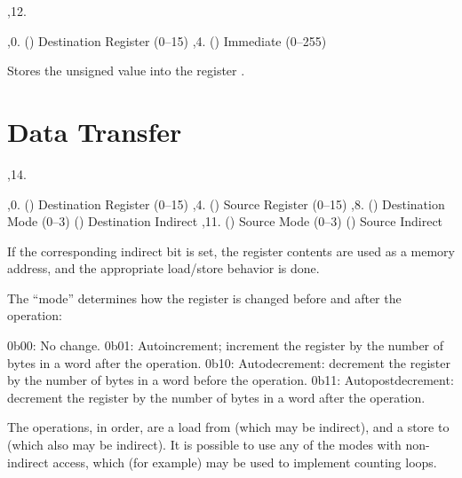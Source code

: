\noindent\ins{},12. 

\li \ins{},0. () Destination Register (0--15)
\li \ins{},4. () Immediate (0--255)

Stores the unsigned value  into the register .

\section{Data Transfer}

\noindent\ins{},14. 

\li \ins{},0. () Destination Register (0--15)
\li \ins{},4. () Source Register (0--15)
\li \ins{},8. () Destination Mode (0--3)
\li \ins{} () Destination Indirect
\li \ins{},11. () Source Mode (0--3)
\li \ins{} () Source Indirect

If the corresponding indirect bit is set, the register contents are used as a
memory address, and the appropriate load/store behavior is done.

The ``mode'' determines how the register is changed before and after the
operation:

\li 0b00: No change.
\li 0b01: Autoincrement; increment the register by the number of bytes in a
word after the operation.
\li 0b10: Autodecrement: decrement the register by the number of bytes in a
word before the operation.
\li 0b11: Autopostdecrement: decrement the register by the number of bytes in a
word after the operation.

The operations, in order, are a load from  (which may be indirect), and
a store to  (which also may be indirect). It is possible to use any of
the modes with non-indirect access, which (for example) may be used to
implement counting loops.

\bye
